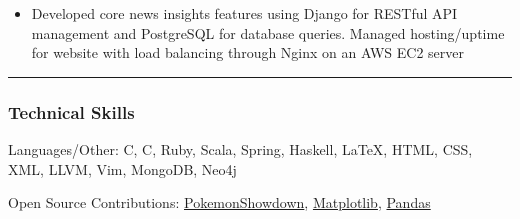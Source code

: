 \documentclass[10pt,letterpaper]{article}
\makeatletter
\newenvironment{indentsection}[1]%
{\begin{list}{}%
		{\setlength{\leftmargin}{#1}}%
		\item[]%
	}
	{\end{list}}
\newcommand{\headerrow}[2]
{\begin{tabular*}{\linewidth}{l@{\extracolsep{\fill}}r}
		#1 &
		#2 \\
\end{tabular*}}
\newcommand{\CPP}
{C\nolinebreak[4]\hspace{-.05em}\raisebox{.22ex}{\footnotesize\bf ++}}
\makeatother
\begin{document}
\begin{itemize}[label={}, leftmargin=*]
\begin{itemize}
			\item Developed core news insights features using Django for  RESTful API management and PostgreSQL for database queries. Managed hosting/uptime for website with load balancing through Nginx on an AWS EC2 server 
		\end{itemize}
	
		
		\iffalse  
			\item 
		\headerrow
		{\textbf{\href{https://github.com/wgma00/mobile-waste-wizard}{Mobile Waste Wizard}}, Waste Categorizing Android Application}
		{\emph{October 2015}}
				{\emph{Tech: Android, Java}}
		\begin{itemize*}
			\item  Redesigned UI by following the Google Material Design guidelines to facilitate search (by text, and voice) 

		\end{itemize*}
		\fi 
	
		
	\end{itemize}



	\hrule
	\vspace{-0.5em}

	\subsubsection*{Technical Skills}
	\begin{indentsection}{\parindent/2}
		\begin{description*}
			\item[Languages/Other:]
			  C, \CPP, Ruby, Scala, Spring, Haskell, \LaTeX, HTML, CSS, XML, LLVM, Vim, MongoDB, Neo4j
			\item[Open Source Contributions:] \href{https://github.com/Zarel/Pokemon-Showdown/commits?author=wlgranados}{PokemonShowdown}, \href{https://github.com/matplotlib/matplotlib/commits?author=wlgranados}{Matplotlib}, 
			\href{}{Pandas}
		\end{description*}
	\end{indentsection}
	
\end{document}
